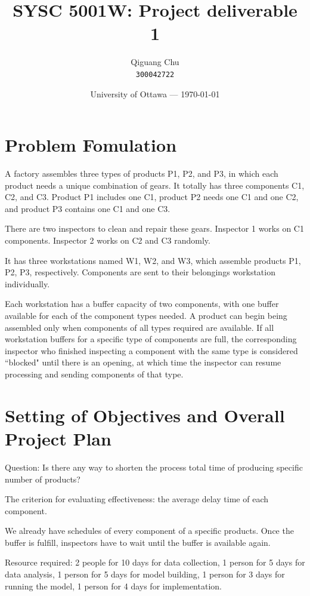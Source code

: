 \documentclass{article}
\title{SYSC 5001W: Project deliverable 1} %
\author{Qiguang Chu\\ \texttt{300042722}} %
\date{University of Ottawa --- \today} %
\begin{document}
\maketitle %

\section{Problem Fomulation} %
	A factory assembles three types of products P1, P2, and P3, in which each product needs a unique combination of gears. It totally has three components C1, C2, and C3. Product P1 includes one C1, product P2 needs one C1 and one C2, and product P3 contains one C1 and one C3.
	
	There are two inspectors to clean and repair these gears. Inspector 1 works on C1 components. Inspector 2 works on C2 and C3 randomly. 
	
	It has three workstations named W1, W2, and W3, which assemble products P1, P2, P3, respectively. Components are sent to their belongings workstation individually. 
	
	Each workstation has a buffer capacity of two components, with one buffer available for each of the component types needed. A product can begin being assembled only when components of all types required are available. If all workstation buffers for a specific type of components are full, the corresponding inspector who finished inspecting a component with the same type is considered “blocked" until there is an opening, at which time the inspector can resume processing and sending components of that type.

\section{Setting of Objectives and Overall Project Plan}

Question: Is there any way to shorten the process total time of producing specific number of products?

The criterion for evaluating effectiveness: the average delay time of each component.

We already have schedules of every component of a specific products. Once the buffer is fulfill, inspectors have to wait until the buffer is available again. 

 Resource required: 2 people for 10 days for data collection, 1 person for 5 days for data analysis, 1 person for 5 days for model building, 1 person for 3 days for running the model, 1 person for 4 days for implementation.
\end{document}
